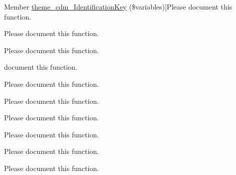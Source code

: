 \begin{DoxyRefList}
Member \hyperlink{cdm__dataportal_8descriptions_8theme_adc7a1f7b72e12e385caf5e5c5d72bd92}{theme\-\_\-cdm\-\_\-\-Identification\-Key} (\$variables)]Please document this function.  
\item[\label{todo__todo000155}%
\hypertarget{todo__todo000155}{}%
Member \hyperlink{cdm__dataportal_8descriptions_8theme_a6df1917c4684c7f29d12e57726e1552b}{theme\-\_\-cdm\-\_\-\-Identifieable\-Source} (\$variables)]Please document this function.  
\item[\label{todo__todo000126}%
\hypertarget{todo__todo000126}{}%
Member \hyperlink{cdm__dataportal_8common_8theme_a8f07e361085f91248d2af5fc6058a77a}{theme\-\_\-cdm\-\_\-list\-\_\-of\-\_\-annotations} (\$variables)]Please document this function.  
\item[\label{todo__todo000195}%
\hypertarget{todo__todo000195}{}%
Member \hyperlink{cdm__dataportal_8taxon_8theme_acba31780b4e754f56d9c3681b9e0dac9}{theme\-\_\-cdm\-\_\-list\-\_\-of\-\_\-taxa} (\$variables)]document this function.  
\item[\label{todo__todo000165}%
\hypertarget{todo__todo000165}{}%
Member \hyperlink{cdm__dataportal_8media_8theme_a4fd56ddf8e880eb36b5ac785ddee70dc}{theme\-\_\-cdm\-\_\-media} (\$variables)]Please document this function.  
\item[\label{todo__todo000170}%
\hypertarget{todo__todo000170}{}%
Member \hyperlink{cdm__dataportal_8media_8theme_a67ca0cfc2055ad74a57c2b9e203f18a6}{theme\-\_\-cdm\-\_\-media\-\_\-caption} (\$variables)]Please document this function.  
\item[\label{todo__todo000172}%
\hypertarget{todo__todo000172}{}%
Member \hyperlink{cdm__dataportal_8media_8theme_aec69676d90bdf4742325f84adce03f1c}{theme\-\_\-cdm\-\_\-media\-\_\-gallerie\-\_\-application} (\$variables)]Please document this function.  
\item[\label{todo__todo000171}%
\hypertarget{todo__todo000171}{}%
Member \hyperlink{cdm__dataportal_8media_8theme_a522eb8d264f6dca8a81f0b768f29e94c}{theme\-\_\-cdm\-\_\-media\-\_\-gallerie\-\_\-image} (\$variables)]Please document this function.  
\item[\label{todo__todo000173}%
\hypertarget{todo__todo000173}{}%
Member \hyperlink{cdm__dataportal_8media_8theme_afc439e2f45d1ca642937ef5dceb393f4}{theme\-\_\-cdm\-\_\-media\-\_\-gallerie\-\_\-text} (\$variables)]Please document this function.  
\item[\label{todo__todo000167}%
\hypertarget{todo__todo000167}{}%
Member \hyperlink{cdm__dataportal_8media_8theme_a63fa1a16bbae8b5d52ca3f1bcb909afc}{theme\-\_\-cdm\-\_\-media\-\_\-mime\-\_\-application} (\$variables)]Please document this function.  

\end{DoxyRefList}
